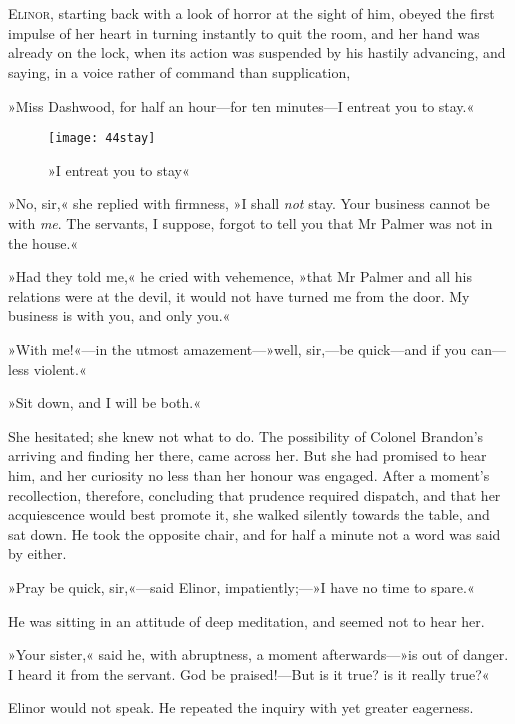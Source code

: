 \chapter[Chapter \thechapter]{}
\lettrine[lines=4,lraise=0.3]{E}{linor}, starting back with a look of horror at the sight of him, obeyed the first impulse of her heart in turning instantly to quit the room, and her hand was already on the lock, when its action was suspended by his hastily advancing, and saying, in a voice rather of command than supplication,

»Miss Dashwood, for half an hour—for ten minutes—I entreat you to stay.«

\begin{figure}[tbph]
\centering
\texttt{[image: 44stay]}
\caption{»I entreat you to stay«}
\end{figure}

»No, sir,« she replied with firmness, »I shall \textit{not} stay. Your business cannot be with \textit{me}. The servants, I suppose, forgot to tell you that Mr Palmer was not in the house.«

»Had they told me,« he cried with vehemence, »that Mr Palmer and all his relations were at the devil, it would not have turned me from the door. My business is with you, and only you.«

»With me!«—in the utmost amazement—»well, sir,—be quick—and if you can—less violent.«

»Sit down, and I will be both.«

She hesitated; she knew not what to do. The possibility of Colonel Brandon’s arriving and finding her there, came across her. But she had promised to hear him, and her curiosity no less than her honour was engaged. After a moment’s recollection, therefore, concluding that prudence required dispatch, and that her acquiescence would best promote it, she walked silently towards the table, and sat down. He took the opposite chair, and for half a minute not a word was said by either.

»Pray be quick, sir,«—said Elinor, impatiently;—»I have no time to spare.«

He was sitting in an attitude of deep meditation, and seemed not to hear her.

»Your sister,« said he, with abruptness, a moment afterwards—»is out of danger. I heard it from the servant. God be praised!—But is it true? is it really true?«

Elinor would not speak. He repeated the inquiry with yet greater eagerness.


